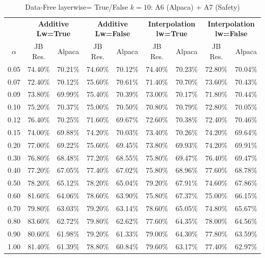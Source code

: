 \begin{table}[h]
\centering
\caption{Data-Free layerwise= True/False $k=10$: A6 (Alpaca) + A7 (Safety)}
\label{tab:res_a6_data_free_10}
\begin{tabular}{c|cc|cc|cc|cc}
\hline
 & \multicolumn{2}{c|}{\textbf{Additive Lw=True}} & \multicolumn{2}{c|}{\textbf{Additive Lw=False}} & \multicolumn{2}{c|}{\textbf{Interpolation lw=True}}& \multicolumn{2}{c}{\textbf{Interpolation lw=False}} \\
$\alpha$ & JB Res. & Alpaca & JB Res. & Alpaca & JB Res. & Alpaca & JB Res. & Alpaca \\
\hline
0.05 & 74.40\% & 70.21\% & 74.60\% & 70.12\% & 74.40\% & 70.23\% & 72.80\% & 70.04\% \\
0.07 & 72.40\% & 70.12\% & 75.60\% & 70.61\% & 71.40\% & 70.70\% & 73.60\% & 70.43\% \\
0.09 & 73.80\% & 69.99\% & 75.40\% & 70.39\% & 73.00\% & 70.17\% & 71.80\% & 70.44\% \\
0.10 & 75.20\% & 70.37\% & 75.00\% & 70.50\% & 70.80\% & 70.79\% & 72.80\% & 70.05\% \\
0.12 & 76.40\% & 70.25\% & 71.60\% & 69.67\% & 72.60\% & 70.38\% & 72.40\% & 70.46\% \\
0.15 & 74.00\% & 69.88\% & 74.20\% & 70.03\% & 73.40\% & 70.26\% & 74.20\% & 69.64\% \\
0.20 & 77.00\% & 69.22\% & 75.60\% & 69.45\% & 73.80\% & 69.93\% & 74.20\% & 69.91\% \\
0.30 & 76.80\% & 68.48\% & 77.20\% & 68.55\% & 75.80\% & 69.47\% & 76.40\% & 69.47\% \\
0.40 & 77.20\% & 67.05\% & 77.40\% & 67.02\% & 75.80\% & 68.96\% & 77.60\% & 68.78\% \\
0.50 & 78.20\% & 65.12\% & 78.20\% & 65.04\% & 79.20\% & 67.91\% & 74.60\% & 67.86\% \\
0.60 & 81.60\% & 64.06\% & 78.60\% & 63.90\% & 75.80\% & 67.37\% & 75.00\% & 66.15\% \\
0.70 & 79.80\% & 63.03\% & 79.20\% & 63.14\% & 78.60\% & 65.05\% & 74.80\% & 65.67\% \\
0.80 & 83.60\% & 62.72\% & 79.80\% & 62.62\% & 77.60\% & 64.35\% & 78.00\% & 64.56\% \\
0.90 & 80.60\% & 61.98\% & 79.20\% & 61.33\% & 79.00\% & 64.30\% & 77.80\% & 63.59\% \\
1.00 & 81.40\% & 61.39\% & 78.80\% & 60.84\% & 79.60\% & 63.17\% & 77.40\% & 62.97\% \\
\hline
\end{tabular}
\end{table}
\FloatBarrier

